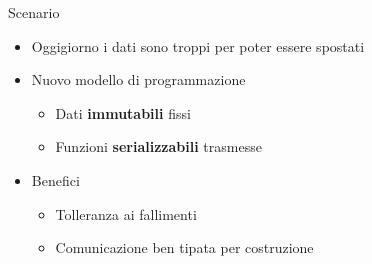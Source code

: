 \begin{frame}{Scenario}
	\begin{itemize}
		\item Oggigiorno i dati sono troppi per poter essere spostati
		\item Nuovo modello di programmazione
		\begin{itemize}
			\item Dati \textbf{immutabili} fissi
			\item Funzioni \textbf{serializzabili} trasmesse 
		\end{itemize}
		\item Benefici
		\begin{itemize}
			\item Tolleranza ai fallimenti
			\item Comunicazione ben tipata per costruzione
		\end{itemize}
	\end{itemize}
\end{frame}